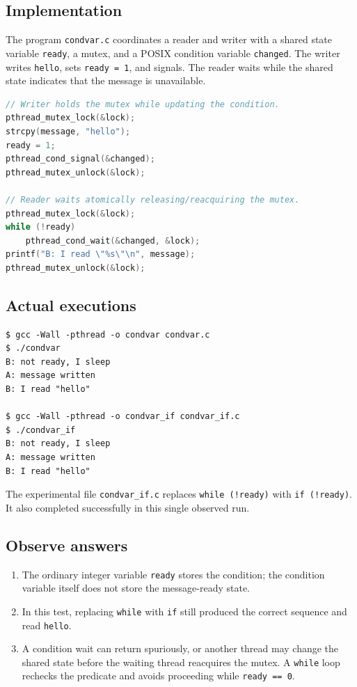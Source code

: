 \documentclass[12pt,a4paper]{article}
\begin{document}
\subsection{Implementation}
The program \texttt{condvar.c} coordinates a reader and writer with a shared state variable \texttt{ready}, a mutex, and a POSIX condition variable \texttt{changed}. The writer writes \texttt{hello}, sets \texttt{ready = 1}, and signals. The reader waits while the shared state indicates that the message is unavailable.
\begin{lstlisting}[language=C]
// Writer holds the mutex while updating the condition.
pthread_mutex_lock(&lock);
strcpy(message, "hello");
ready = 1;
pthread_cond_signal(&changed);
pthread_mutex_unlock(&lock);

// Reader waits atomically releasing/reacquiring the mutex.
pthread_mutex_lock(&lock);
while (!ready)
    pthread_cond_wait(&changed, &lock);
printf("B: I read \"%s\"\n", message);
pthread_mutex_unlock(&lock);
\end{lstlisting}
\subsection{Actual executions}
\begin{lstlisting}
$ gcc -Wall -pthread -o condvar condvar.c
$ ./condvar
B: not ready, I sleep
A: message written
B: I read "hello"

$ gcc -Wall -pthread -o condvar_if condvar_if.c
$ ./condvar_if
B: not ready, I sleep
A: message written
B: I read "hello"
\end{lstlisting}
The experimental file \texttt{condvar\_if.c} replaces \texttt{while (!ready)} with \texttt{if (!ready)}. It also completed successfully in this single observed run.

\subsection{Observe answers}
\begin{enumerate}[label=\arabic*.]
\item The ordinary integer variable \texttt{ready} stores the condition; the condition variable itself does not store the message-ready state.
\item In this test, replacing \texttt{while} with \texttt{if} still produced the correct sequence and read \texttt{hello}.
\item A condition wait can return spuriously, or another thread may change the shared state before the waiting thread reacquires the mutex. A \texttt{while} loop rechecks the predicate and avoids proceeding while \texttt{ready == 0}.
\end{enumerate}
\end{document}
